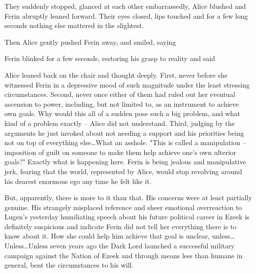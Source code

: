 They suddenly stopped, glanced at each other embarrassedly, Alice blushed and Ferin abruptly leaned forward. Their eyes closed, lips touched and for a few long seconds nothing else mattered in the slightest.

Then Alice gently pushed Ferin away, and smiled, saying 

Ferin blinked for a few seconds, restoring his grasp to reality and said 

Alice leaned back on the chair and thought deeply. First, never before she witnessed Ferin in a depressive mood of such magnitude under the least stressing circumstances. Second, never once either of them had ruled out her eventual ascension to power, including, but not limited to, as an instrument to achieve own goals. Why would this all of a sudden pose such a big problem, and what kind of a problem exactly -- Alice did not understand. Third, judging by the arguments he just invoked about not needing a support and his priorities being not on top of everything else\dots What an asshole. "This is called a manipulation -- imposition of guilt on someone to make them help achieve one's own ulterior goals?" Exactly what is happening here. Ferin is being jealous and manipulative jerk, fearing that the world, represented by Alice, would stop revolving around his dearest enormous ego any time he felt like it.

But, apparently, there is more to it than that. His concerns were at least partially genuine. His strangely misplaced reference and sheer emotional overreaction to Lugen's yesterday humiliating speech about his future political career in Ezeek is definitely suspicious and indicate Ferin did not tell her everything there is to know about it. How she could help him achieve that goal is unclear, unless\dots Unless\dots Unless seven years ago the Dark Lord launched a successful military campaign against the Nation of Ezeek and through means less than humane in general, bent the circumstances to his will.

